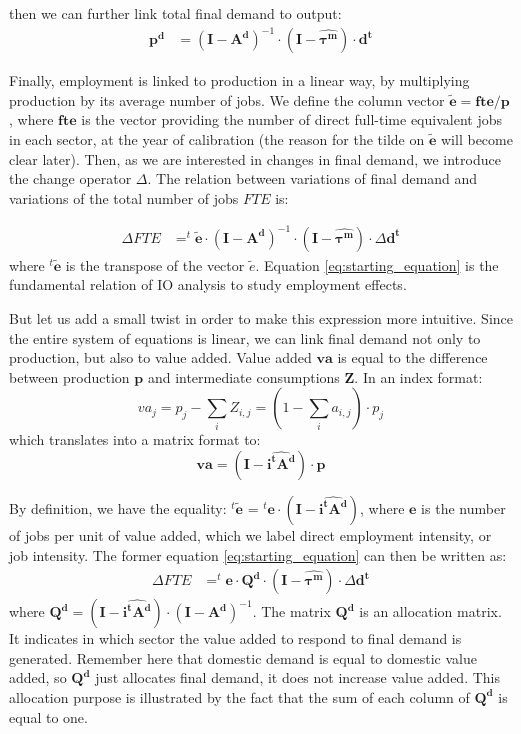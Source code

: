 then we can further link total final demand to output:
\begin{align*}	
	\pmb{p^d} &= (\pmb{I} - \pmb{A^d})^{-1} \cdot (\pmb{I} - \pmb{\widehat{\tau^m}}) \cdot \pmb{d^t}	
\end{align*}

Finally, employment is linked to production in a linear way, by multiplying production by its average number of jobs. We define the column vector $\pmb{\tilde{e}} = \pmb{fte}/\pmb{p}$, where $\pmb{fte}$ is the vector providing the number of direct full-time equivalent jobs in each sector, at the year of calibration (the reason for the tilde on $\pmb{\tilde{e}}$ will become clear later). 
Then, as we are interested in changes in final demand, we introduce the change operator $\Delta$. 
The relation between variations of final demand and variations of the total number of jobs $FTE$ is:

\begin{align}	
	\Delta FTE &=  ^t\pmb{\tilde{e}} \cdot (\pmb{I} - \pmb{A^d})^{-1} \cdot (\pmb{I} - \pmb{\widehat{\tau^m}})\cdot \Delta \pmb{d^t}
	\label{eq:starting_equation}
\end{align}
where $^t\pmb{\tilde{e}}$ is the transpose of the vector $\tilde{e}$. Equation \ref{eq:starting_equation} is the fundamental relation of IO analysis to study employment effects. 

But let us add a small twist in order to make this expression more intuitive. 
Since the entire system of equations is linear, we can link final demand not only to production, but also to value added.
Value added $\pmb{va}$ is equal to the difference between production $\pmb{p}$ and intermediate consumptions $\pmb{Z}$. 
In an index format:
$$va_j = p_j - \sum_i Z_{i,j} =  (1 - \sum_i a_{i,j}) \cdot p_j$$
which translates into a matrix format to:
$$\pmb{va} = (\pmb{I} - \widehat{\pmb{i^t A^d}}) \cdot \pmb{p}$$

By definition, we have the equality: 
$^t\pmb{\tilde{e}}$ = $^t\pmb{e} \cdot (\pmb{I} - \widehat{\pmb{i^t A^d}}) $, where $\pmb{e}$ is the number of jobs per unit of value added, which we label direct employment intensity, or job intensity. The former equation \eqref{eq:starting_equation} can then be written as:
\begin{align}	
	\Delta FTE &=  ^t\pmb{e} \cdot \pmb{Q^d} \cdot (\pmb{I} - \widehat{\pmb{\tau^m}}) \cdot \Delta \pmb{d^t}
	\label{eq:starting_equation2}
\end{align}
where  $\pmb{Q^d} = (\pmb{I} - \widehat{\pmb{i^t A^d}}) \cdot (\pmb{I} - \pmb{A^d})^{-1}$. The matrix $\pmb{Q^d}$ is an allocation matrix. It indicates in which sector the value added to respond to final demand is generated. Remember here that domestic demand is equal to domestic value added, so $\pmb{Q^d}$ just allocates final demand, it does not increase value added. This allocation purpose is illustrated by the fact that the sum of each column of $\pmb{Q^d}$ is equal to one.

